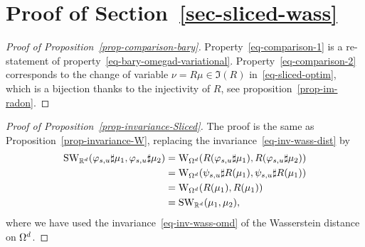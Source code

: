 \section{Proof of Section~\ref{sec-sliced-wass}} 
\label{sec-appendix-sliced}

\begin{proof}[Proof of Proposition~\ref{prop-comparison-bary}]
	Property~\eqref{eq-comparison-1} is a re-statement of property~\eqref{eq-bary-omegad-variational}.
	Property~\eqref{eq-comparison-2} corresponds to the change of variable $\nu = R\mu \in \Im(R)$ in~\eqref{eq-sliced-optim}, which is a bijection thanks to the injectivity of $R$, see proposition~\ref{prop-im-radon}.
\end{proof}

\begin{proof}[Proof of Proposition~\ref{prop-invariance-Sliced}]
	The proof is the same as Proposition~\ref{prop-invariance-W}, replacing the invariance~\eqref{eq-inv-wass-dist} by
	\begin{align*}
		\text{\upshape SW}_{\mathbb{R}^d}(\varphi_{s,u} \sharp \mu_1,\varphi_{s,u} \sharp \mu_2)
		&= \text{\upshape W}_{\Omega^d}( R( \varphi_{s,u} \sharp \mu_1 ), R( \varphi_{s,u} \sharp \mu_2 ) ) \\
		&= \text{\upshape W}_{\Omega^d}( \psi_{s,u} \sharp R( \mu_1 ),  \psi_{s,u} \sharp R( \mu_1 ) ) \\
		&= \text{\upshape W}_{\Omega^d}( R( \mu_1 ),  R( \mu_1 ) ) \\
		&= \text{\upshape SW}_{\mathbb{R}^d}( \mu_1, \mu_2),
	\end{align*}
	where we have used the invariance~\eqref{eq-inv-wass-omd} of the Wasserstein distance on $\Omega^d$.
\end{proof}

